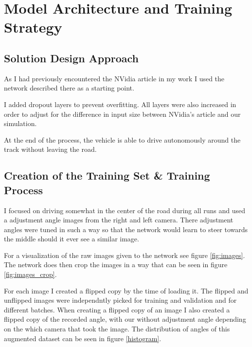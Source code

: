 \documentclass[12pt,a4paper]{article}
\begin{document}
\section{Model Architecture and Training Strategy}

\subsection{Solution Design Approach}

As I had previously encountered the NVidia article in my work I used the network described there as a starting point. 

I added dropout layers to prevent overfitting. All layers were also increased in order to adjust for the difference in input size between NVidia's article and our simulation.

At the end of the process, the vehicle is able to drive autonomously around the track without leaving the road.

\subsection{Creation of the Training Set \& Training Process}

I focused on driving somewhat in the center of the road during all runs and used a adjustment angle images from the right and left camera. There adjustment angles were tuned in such a way so that the network would learn to steer towards the middle should it ever see a similar image.

For a visualization of the raw images given to the network see figure \ref{fig:images}. The network does then crop the images in a way that can be seen in figure \ref{fig:images_crop}.

For each image I created a flipped copy by the time of loading it. The flipped and unflipped images were independntly picked for training and validation and for different batches. When creating a flipped copy of an image I also created a flipped copy of the recorded angle, with our without adjustment angle depending on the which camera that took the image. The distribution of angles of this augmented dataset can be seen in figure \ref{histogram}.
\end{document}
